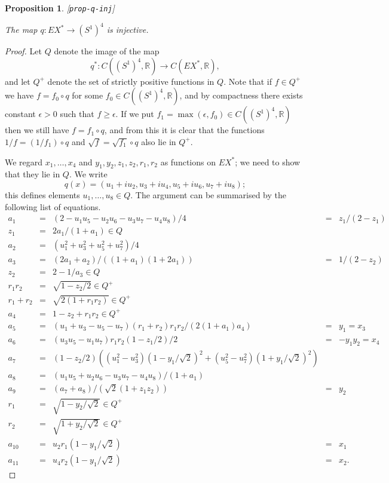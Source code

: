 \documentclass[reqno]{amsart}
\newcommand{\lbl}[1]{\label{#1}\textup{[\texttt{#1}]}\par}
\newcommand{\lbl}{\label}
\newcommand{\ep}        {\epsilon}
\newcommand{\R}         {{\mathbb{R}}}
\newcommand{\rt}        {\sqrt{2}}
\renewcommand{\:}{\colon}
\newtheorem{proposition}[theorem]{Proposition}
\theoremstyle{definition}
\begin{document}
\begin{proposition}\lbl{prop-q-inj}
 The map $q\:EX^*\to(S^1)^4$ is injective.
\end{proposition}
\begin{proof}
 Let $Q$ denote the image of the map
 \[ q^*\:C((S^1)^4,\R) \to C(EX^*,\R), \]
 and let $Q^+$ denote the set of strictly positive functions in $Q$.
 Note that if $f\in Q^+$ we have $f=f_0\circ q$ for some
 $f_0\in C((S^1)^4,\R)$, and by compactness there exists constant
 $\ep>0$ such that $f\geq\ep$.  If we put
 $f_1=\max(\ep,f_0)\in C((S^1)^4,\R)$ then we still have
 $f=f_1\circ q$, and from this it is clear that the functions
 $1/f=(1/f_1)\circ q$ and $\sqrt{f}=\sqrt{f_1}\circ q$ also lie in
 $Q^+$.

 We regard $x_1,\dotsc,x_4$ and $y_1,y_2,z_1,z_2,r_1,r_2$ as functions
 on $EX^*$; we need to show that they lie in $Q$.  We write
 \[ q(x) = (u_1+iu_2,u_3+iu_4,u_5+iu_6,u_7+iu_8); \]
 this defines elements $u_1,\dotsc,u_8\in Q$.  The argument can be
 summarised by the following list of equations.
 \[
  \begin{array}{rclcl}
   a_1 &=& (2-u_1u_5-u_2u_6-u_3u_7-u_4u_8)/4 &=& z_1/(2-z_1) \\
   z_1 &=& 2a_1/(1+a_1) \in Q \\
   a_2 &=& (u_1^2+u_3^2+u_5^2+u_7^2)/4 \\
   a_3 &=& (2a_1+a_2)/((1+a_1)(1+2a_1)) &=& 1/(2-z_2) \\
   z_2 &=& 2 - 1/a_3 \in Q \\
   r_1r_2 &=& \sqrt{1-z_2/2} \in Q^+ \\
   r_1+r_2 &=& \sqrt{2(1+r_1r_2)} \in Q^+ \\
   a_4 &=& 1-z_2+r_1r_2 \in Q^+ \\
   a_5 &=& (u_1+u_3-u_5-u_7)(r_1+r_2)r_1r_2/(2(1+a_1)a_4) &=& y_1 = x_3\\
   a_6 &=& (u_3u_5-u_1u_7)r_1r_2(1-z_1/2)/2 &=& -y_1y_2 = x_4 \\
   a_7 &=& (1-z_2/2)((u_1^2-u_3^2)(1-y_1/\rt)^2+(u_5^2-u_7^2)(1+y_1/\rt)^2) \\
   a_8 &=& (u_1u_5+u_2u_6-u_3u_7-u_4u_8)/(1+a_1) \\
   a_9 &=& (a_7+a_8)/(\rt(1+z_1z_2)) &=& y_2 \\
   r_1 &=& \sqrt{1-y_2/\rt} \in Q^+ \\
   r_2 &=& \sqrt{1+y_2/\rt} \in Q^+ \\
   a_{10} &=& u_2r_1(1-y_1/\rt) &=& x_1 \\
   a_{11} &=& u_4r_2(1-y_1/\rt) &=& x_2.
  \end{array}
 \]


\end{proof}
\end{document}
